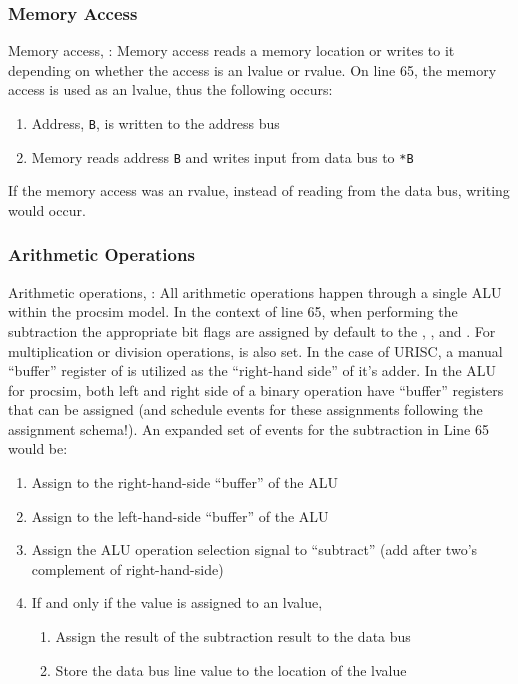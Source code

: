 \subsubsection*{Memory Access}

Memory access, : Memory access reads a memory location or writes to it depending on whether the access is an lvalue or rvalue. On line 65, the memory access is used as an lvalue, thus the following occurs:
\begin{enumerate}
    \item Address, \texttt{B}, is written to the address bus
    \item Memory reads address \texttt{B} and writes input from data bus to \texttt{*B}
\end{enumerate}
If the memory access was an rvalue, instead of reading from the data bus, writing would occur. 
    
\subsubsection*{Arithmetic Operations}

Arithmetic operations, : All arithmetic operations happen through a single ALU within the procsim model. In the context of line 65, when performing the subtraction the appropriate bit flags are assigned by default to the , , and . For multiplication or division operations,  is also set. In the case of URISC, a manual ``buffer'' register of  is utilized as the ``right-hand side'' of it's adder. In the ALU for procsim, both left and right side of a binary operation have ``buffer'' registers that can be assigned (and schedule events for these assignments following the assignment schema!). An expanded set of events for the subtraction in Line 65 would be: 
\begin{enumerate}
    \item Assign  to the right-hand-side ``buffer'' of the ALU
    \item Assign  to the left-hand-side ``buffer'' of the ALU
    \item Assign the ALU operation selection signal to ``subtract'' (add after two's complement of right-hand-side)
    \item If and only if the value is assigned to an lvalue,
    \begin{enumerate}
        \item Assign the result of the subtraction result to the data bus
        \item Store the data bus line value to the location of the lvalue
    \end{enumerate}
\end{enumerate}

